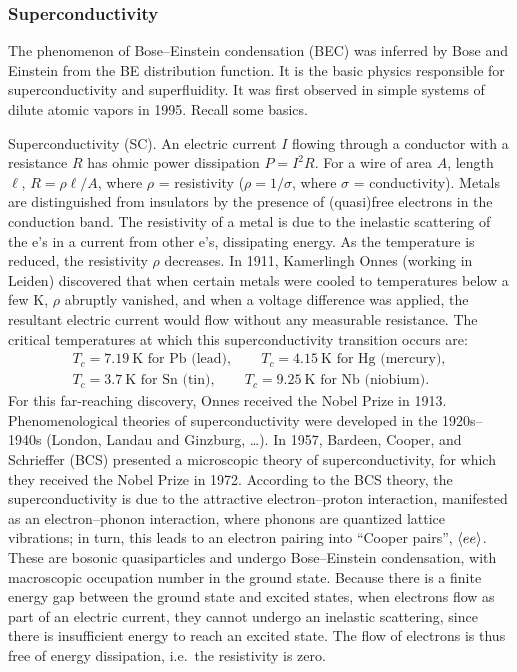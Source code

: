 \subsubsection*{Superconductivity}

The phenomenon of Bose--Einstein condensation (BEC) was inferred by Bose and Einstein from the BE distribution function. It
is the basic physics responsible for superconductivity and superfluidity. It was first observed in simple systems of dilute
atomic vapors in 1995. Recall some basics.

Superconductivity (SC). An electric current $I$ flowing through a conductor with a resistance $R$ has ohmic power
dissipation $P = I^2R$. For a wire of area $A$, length $\ell$, $R = \rho\ell/A$, where $\rho$ = resistivity
($\rho = 1/\sigma$, where $\sigma$ = conductivity). Metals are distinguished from insulators by the presence of
(quasi)free electrons in the conduction band. The resistivity of a metal is due to the inelastic scattering of the e's in a
current from other e's, dissipating energy. As the temperature is reduced, the resistivity $\rho$ decreases. In 1911,
Kamerlingh Onnes (working in Leiden) discovered that when certain metals were cooled to temperatures below a few K, $\rho$
abruptly vanished, and when a voltage difference was applied, the resultant electric current would flow without any measurable
resistance. The critical temperatures at which this superconductivity transition occurs are:
\begin{gather*}
  T_c = 7.19\ \text{K for Pb (lead)},\qquad T_c = 4.15\ \text{K for Hg (mercury)},\\
  T_c = 3.7\ \text{K for Sn (tin)},\qquad T_c = 9.25\ \text{K for Nb (niobium)}.
\end{gather*}
For this far-reaching discovery, Onnes received the Nobel Prize in 1913. Phenomenological theories of superconductivity were
developed in the 1920s--1940s (London, Landau and Ginzburg, \ldots). In 1957, Bardeen, Cooper, and Schrieffer (BCS) presented
a microscopic theory of superconductivity, for which they received the Nobel Prize in 1972. According to the BCS theory, the
superconductivity is due to the attractive electron--proton interaction, manifested as an electron--phonon interaction, where
phonons are quantized lattice vibrations; in turn, this leads to an electron pairing into ``Cooper pairs'', $\langle ee\rangle$. These
are bosonic quasiparticles and undergo Bose--Einstein condensation, with macroscopic occupation number in the ground state.
Because there is a finite energy gap between the ground state and excited states, when electrons flow as part of an electric
current, they cannot undergo an inelastic scattering, since there is insufficient energy to reach an excited state. The flow of
electrons is thus free of energy dissipation, i.e.\ the resistivity is zero.

